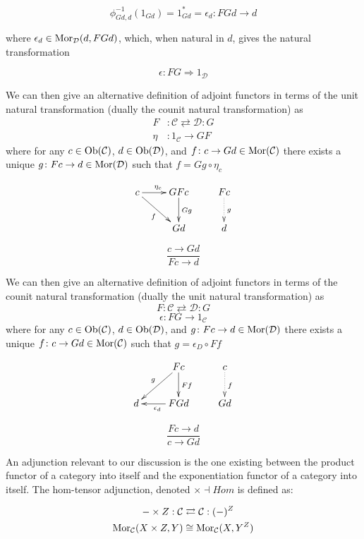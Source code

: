 \documentclass[aps,twocolumn]{revtex4-1}
\begin{document}
$$
\phi_{Gd,d}^{-1}(1_{Gd})=1_{Gd}^*=\epsilon_d: FGd \rightarrow d
$$

where $\epsilon_d \in \mathop{\rm Mor}\nolimits_{\mathcal{D}}(d,FGd)$, which, when natural in $d$, gives the natural transformation

$$
\epsilon: FG \Rightarrow 1_{\mathcal{D}}
$$

We can then give an alternative definition of adjoint functors in terms of the unit natural transformation (dually the counit natural transformation) as
\begin{align*}
F & \colon \mathcal{C} \rightleftarrows \mathcal{D} \colon G\\
\eta & \colon 1_{\mathcal{C}} \rightarrow GF
\end{align*}
where for any $c \in \mathop{\rm Ob}\nolimits (\mathcal{C})$, $d \in \mathop{\rm Ob}\nolimits (\mathcal{D})$, and $f \colon c \rightarrow Gd \in \mathop{\rm Mor}\nolimits(\mathcal{C})$ there exists a unique $g \colon Fc \rightarrow d \in \mathop{\rm Mor}\nolimits(\mathcal{D})$ such that $f = Gg \circ \eta_c$				

		$$
					\xymatrix{
					c \ar[r]^{\eta_c} \ar[dr]_{f} & G F c \ar[d]^{G g} & F c \ar@{.>}[d]^{g}\\
					& G d & d}
		$$
	
		$$
			\frac{c \longrightarrow Gd}{Fc \longrightarrow d}
		$$
	
We can then give an alternative definition of adjoint functors in terms of the counit natural transformation (dually the unit natural transformation) as
$$
F \colon \mathcal{C} \rightleftarrows \mathcal{D} \colon G
$$
$$
\epsilon \colon FG \rightarrow 1_{\mathcal{C}}
$$
where for any $c \in \mathop{\rm Ob}\nolimits (\mathcal{C})$, $d \in \mathop{\rm Ob}\nolimits (\mathcal{D})$, and $g \colon Fc \rightarrow d \in \mathop{\rm Mor}\nolimits(\mathcal{D})$ there exists a unique $f \colon c \rightarrow Gd \in \mathop{\rm Mor}\nolimits(\mathcal{C})$ such that $g = \epsilon_D \circ Ff$	

$$
			\xymatrix{
			& F c \ar[d]^{F f} \ar[dl]_{g} & c \ar@{.>}[d]^{f}\\
			d & F G d \ar[l]^{\epsilon_d} & G d}
$$

		$$
			\frac{Fc \longrightarrow d}{c \longrightarrow Gd}
		$$
		
An adjunction relevant to our discussion is the one existing between the product functor of a category into itself and the exponentiation functor of a category into itself. The hom-tensor adjunction, denoted $\times \dashv Hom$ is defined as:
		
		\begin{align*}
- \times Z: \mathcal{C} & \rightleftarrows \mathcal{C}: (-)^Z\\
\mathop{\rm Mor}\nolimits_{\mathcal{C}}(X \times Z, Y) & \cong  \mathop{\rm Mor}\nolimits_{\mathcal{C}}(X, Y^Z)
\end{align*}
\end{document}
